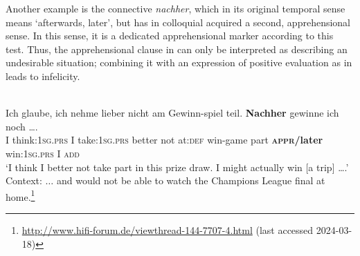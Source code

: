 \documentclass[output=paper,colorlinks,citecolor=brown]{langscibook}
\begin{document}
 Another example is the  connective \textit{nachher}, which in its original temporal sense means `afterwards, later', but has in colloquial  acquired a second, apprehensional sense. In this sense, it is a dedicated apprehensional marker according to this test. Thus, the apprehensional clause in  can only be interpreted as describing an undesirable situation; combining it with an expression of positive evaluation as in  leads to infelicity.

\ea \label{ex:intro17} 
\\
\ea \label{ex:intro17a}
\gll Ich glaube, ich nehme lieber nicht am Gewinn-spiel	teil. \textbf{Nachher} gewinne ich noch \ldots. \\
I think:\textsc{1sg.prs} I take:\textsc{1sg.prs} better not at:\textsc{def} win-game part \textsc{\textbf{appr/}}\textbf{later} win:\textsc{1sg.prs} I \textsc{add} \\
\glt `I think I better not take part in this prize draw. I might actually win [a trip] \ldots.' \\
Context: $\ldots$ and would not be able to watch the Champions League final at home.\footnote{\url{http://www.hifi-forum.de/viewthread-144-7707-4.html} (last accessed 2024-03-18)} \\
\z
\z
\end{document}
